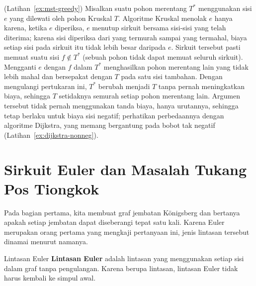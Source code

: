\begin{solution}(Latihan~\ref{ex:mst-greedy})
Misalkan suatu pohon merentang $T^*$ menggunakan sisi $e$ yang dilewati oleh pohon Kruskal $T$.  Algoritme Kruskal menolak $e$ hanya karena, ketika $e$ diperiksa, $e$ menutup sirkuit bersama sisi-sisi yang telah diterima; karena sisi diperiksa dari yang termurah sampai yang termahal, biaya setiap sisi pada sirkuit itu tidak lebih besar daripada $e$.  Sirkuit tersebut pasti memuat suatu sisi $f \notin T^*$ (sebuah pohon tidak dapat memuat seluruh sirkuit).  Mengganti $e$ dengan $f$ dalam $T^*$ menghasilkan pohon merentang lain yang tidak lebih mahal dan bersepakat dengan $T$ pada satu sisi tambahan.  Dengan mengulangi pertukaran ini, $T^*$ berubah menjadi $T$ tanpa pernah meningkatkan biaya, sehingga $T$ setidaknya semurah setiap pohon merentang lain.  Argumen tersebut tidak pernah menggunakan tanda biaya, hanya urutannya, sehingga tetap berlaku untuk biaya sisi negatif; perhatikan perbedaannya dengan algoritme Dijkstra, yang memang bergantung pada bobot tak negatif (Latihan~\ref{ex:dijkstra-nonneg}).
\end{solution}

\ifdefined \old

\section{Sirkuit Euler dan Masalah Tukang Pos Tiongkok}
Pada bagian pertama, kita membuat graf jembatan K\"onigsberg dan bertanya apakah setiap jembatan dapat diseberangi tepat satu kali.  Karena Euler merupakan orang pertama yang mengkaji pertanyaan ini, jenis lintasan tersebut dinamai menurut namanya.

\begin{definition}{Lintasan Euler}
\textbf{Lintasan Euler} adalah lintasan yang menggunakan setiap sisi dalam graf tanpa pengulangan.  Karena berupa lintasan, lintasan Euler tidak harus kembali ke simpul awal.
\end{definition}

